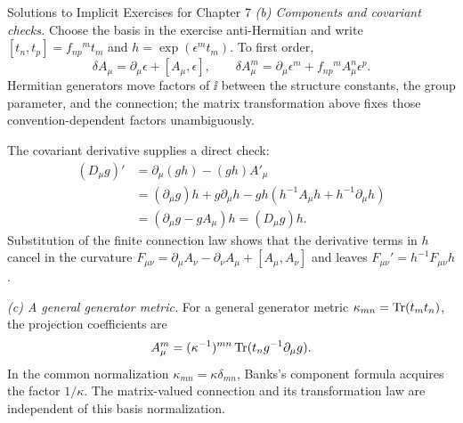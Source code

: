 \begin{bankssolutions}{Solutions to Implicit Exercises for Chapter 7}
\textit{(b) Components and covariant checks.}
Choose the basis in the exercise anti-Hermitian and write
$[t_n,t_p]=f_{np}{}^m t_m$ and
$h=\exp(\epsilon^mt_m)$.  To first order,
\[
 \delta A_\mu=\partial_\mu\epsilon+[A_\mu,\epsilon],
 \qquad
 \delta A_\mu^m=\partial_\mu\epsilon^m
 +f_{np}{}^mA_\mu^n\epsilon^p.
\]
Hermitian generators move factors of $\ii$ between the structure constants,
the group parameter, and the connection; the matrix transformation above
fixes those convention-dependent factors unambiguously.

The covariant derivative supplies a direct check:
\begin{align*}
 (D_\mu g)'
 &=\partial_\mu(gh)-(gh)A'_\mu\\
 &=(\partial_\mu g)h+g\partial_\mu h
 -gh\left(h^{-1}A_\mu h+h^{-1}\partial_\mu h\right)\\
 &=(\partial_\mu g-gA_\mu)h=(D_\mu g)h.
\end{align*}
Substitution of the finite connection law shows that the derivative terms in
$h$ cancel in the curvature
$F_{\mu\nu}=\partial_\mu A_\nu-\partial_\nu A_\mu+[A_\mu,A_\nu]$
and leaves $F_{\mu\nu}'=h^{-1}F_{\mu\nu}h$.

\textit{(c) A general generator metric.}
For a general generator metric
$\kappa_{mn}=\operatorname{Tr}(t_mt_n)$, the projection coefficients are
\[
 A_\mu^m=(\kappa^{-1})^{mn}
 \operatorname{Tr}(t_n g^{-1}\partial_\mu g).
\]
In the common normalization $\kappa_{mn}=\kappa\delta_{mn}$, Banks's
component formula acquires the factor $1/\kappa$.  The matrix-valued
connection and its transformation law are independent of this basis
normalization.

\end{bankssolutions}
